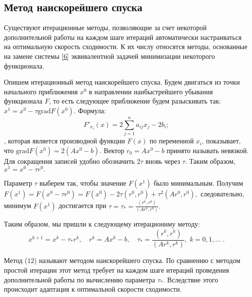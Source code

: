 \documentclass[a4paper,12pt]{article}
\begin{document}
{\subsection{Метод наискорейшего спуска}
\hspace{1.25cm}Существуют итерационные методы, позволяющие за счет некоторой дополнительной работы на 
каждом шаге итераций автоматически настраиваться на оптимальную скорость сходимости. К их числу относятся методы, основанные 
на замене системы \eqref{6} эквивалентной задачей минимизации некоторого функционала.

Опишем итерационный метод наискорейшего спуска. Будем двигаться из точки началь\-ного приближения $x^0$ в направлении наибыстрейшего убывания функционала $F$, 
то есть следующее приближение будем разыскивать так: $x^1=x^0 - \tau \mathrm { grad } F(x^0).$ Формула:
\begin{equation}
    F'_{x_i}(x) = 2\sum\limits_{j=1}^{n}a_{ij}x_j - 2b_i;
    \label{11}
\end{equation}
, которая является производной функции $F(x)$ по переменной $x_i$, показывает, что $\mathrm { grad } F(x^0)=2(Ax^0-b).$ 
Вектор $r_0 = Ax^0-b$ принято называть невязкой. Для сокращения записей удобно обозначить $2\tau$ вновь через $\tau.$ 
Таким образом, $x^1=x^0-\tau r^0.$

Параметр $\tau$ выберем так, чтобы значение $F(x^1)$ было минимальным. Получим $F(x^1)=F(x^0-\tau r^0)=F(x^0)-2\tau(r^0,r^0)+\tau^2(Ar^0,r^0),$ 
следовательно, минимум $F(x^1)$ достигается при $\tau =\tau_*=\displaystyle\frac{(r^0, r^0)}{(Ar^0, r^0)}.$

Таким образом, мы пришли к следующему итерационнму методу:
\begin{equation}
x^{k+1}=x^k-\tau_* r^k, \quad r^k=Ax^k-b, \quad \tau_*=\displaystyle\frac{(r^k, r^k)}{(Ar^k, r^k)}, \; k=0,1, \dots \;.
 \label{12}
\end{equation}

Метод ($12$) называют методом наискорейшего спуска. По сравнению с методом простой итерации этот метод требует на каждом шаге итераций 
проведения дополнительной работы по вычислению параметра $\tau_*.$ Вследствие этого происходит адаптация к оптимальной скорости сходимости.

}
\end{document}
